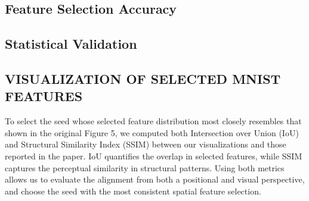 \documentclass[a4paper,twocolumn]{article} %
\begin{document}
\begin{table*}[ht]
\centering
{}
\caption{Comparison of mean accuracy and p-values between methods and corresponding paper baselines across datasets.}
\label{tab:method-comparison}
\end{table*}


\subsection{Feature Selection Accuracy}


\subsection{Statistical Validation}
\subsection{VISUALIZATION OF SELECTED MNIST FEATURES}
To select the seed whose selected feature distribution most closely resembles that shown in the original Figure 5, we computed both Intersection over Union (IoU) and Structural Similarity Index (SSIM) between our visualizations and those reported in the paper. IoU quantifies the overlap in selected features, while SSIM captures the perceptual similarity in structural patterns. Using both metrics allows us to evaluate the alignment from both a positional and visual perspective, and choose the seed with the most consistent spatial feature selection.
\end{document}
